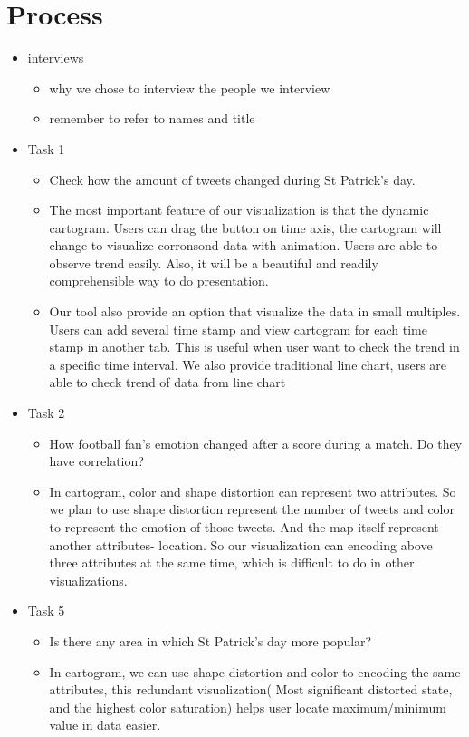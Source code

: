 \documentclass[journal]{vgtc}                %
\begin{document}
\section{Process}
\begin{itemize}
\item interviews
\begin{itemize}
\item why we chose to interview the people we interview
\item remember to refer to names and title
\end{itemize}
\item Task 1
\begin{itemize}
\item Check how the amount of tweets changed during St Patrick's day.
\item The most important feature of our visualization is that the dynamic cartogram. Users can drag the button on time axis, the cartogram will change to visualize corronsond data  with animation.  Users are able to observe trend easily. Also, it will be a beautiful and readily comprehensible way to do presentation.
\item Our tool also provide an option that visualize the data in small multiples. Users can add several time stamp and view cartogram for each time stamp in another tab. This is useful when user want to check the trend in a specific time interval. 
We also provide traditional line chart, users are able to check trend of data from line chart
\end{itemize}
\item Task 2
\begin{itemize}
\item How football fan’s emotion changed after a score during a match. Do they have correlation?
\item In cartogram, color and shape distortion can represent two attributes. So we plan to use shape distortion represent the number of tweets and color to represent the emotion of those tweets. And the map itself represent another attributes- location. So our visualization can encoding above three attributes at the same time, which is difficult to do in other visualizations. 
\end{itemize}

\item Task 5
\begin{itemize}
\item Is there any area in which St Patrick's day more popular?
\item In cartogram, we can use shape distortion and color to encoding the same attributes, this redundant visualization( Most significant distorted state, and the highest color saturation) helps user locate maximum/minimum value in data easier.
\end{itemize}


\end{itemize}
\end{document}
